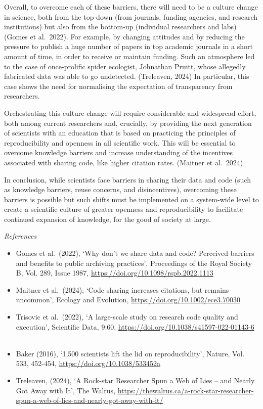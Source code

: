 \documentclass[
]{article}
\begin{document}
Overall, to overcome each of these barriers, there will need to be a
culture change in science, both from the top-down (from journals,
funding agencies, and research institutions) but also from the bottom-up
(individual researchers and labs) (Gomes et al.~2022). For example, by
changing attitudes and by reducing the pressure to publish a huge number
of papers in top academic journals in a short amount of time, in order
to receive or maintain funding. Such an atmosphere led to the case of
once-prolific spider ecologist, Johnathan Pruitt, whose allegedly
fabricated data was able to go undetected. (Treleaven, 2024) In
particular, this case shows the need for normalising the expectation of
transparency from researchers.

Orchestrating this culture change will require considerable and
widespread effort, both among current researchers and, crucially, by
providing the next generation of scientists with an education that is
based on practicing the principles of reproducibility and openness in
all scientific work. This will be essential to overcome knowledge
barriers and increase understanding of the incentives associated with
sharing code, like higher citation rates. (Maitner et al.~2024)

In conclusion, while scientists face barriers in sharing their data and
code (such as knowledge barriers, reuse concerns, and disincentives),
overcoming these barriers is possible but such shifts must be
implemented on a system-wide level to create a scientific culture of
greater openness and reproducibility to facilitate continued expansion
of knowledge, for the good of society at large.

\emph{References}

\begin{itemize}
\item
  Gomes et al.~(2022), `Why don't we share data and code? Perceived
  barriers and benefits to public archiving practices', Proceedings of
  the Royal Society B, Vol. 289, Issue 1987,
  \hyperref[0]{https://doi.org/10.1098/rspb.2022.1113}
\item
  Maitner et al.~(2024), `Code sharing increases citations, but remains
  uncommon', Ecology and Evolution,
  \url{https://doi.org/10.1002/ece3.70030}
\item
  Trisovic et al.~(2022), `A large-scale study on research code quality
  and execution', Scientific Data, 9:60,
  \url{https://doi.org/10.1038/s41597-022-01143-6} ~
\item
  Baker (2016), `1,500 scientists lift the lid on reproducibility',
  Nature, Vol. 533, 452-454, \url{https://doi.org/10.1038/533452a}
\item
  Treleaven, (2024), `A Rock-star Researcher Spun a Web of Lies -- and
  Nearly Got Away with It', The Walrus,
  \url{https://thewalrus.ca/a-rock-star-researcher-spun-a-web-of-lies-and-nearly-got-away-with-it/}
\end{itemize}
\end{document}
